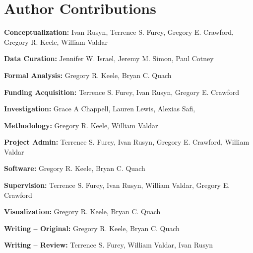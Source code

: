 \documentclass[10pt,letterpaper]{article}
\begin{document}
\section*{Author Contributions}

\noindent \textbf{Conceptualization:} Ivan Rusyn, Terrence S. Furey, Gregory E. Crawford, Gregory R. Keele, William Valdar

\noindent \textbf{Data Curation:} Jennifer W. Israel, Jeremy M. Simon, Paul Cotney

\noindent \textbf{Formal Analysis:} Gregory R. Keele, Bryan C. Quach

\noindent \textbf{Funding Acquisition:} Terrence S. Furey, Ivan Rusyn, Gregory E. Crawford

\noindent \textbf{Investigation:} Grace A Chappell, Lauren Lewis, Alexias Safi,

\noindent \textbf{Methodology:} Gregory R. Keele, William Valdar

\noindent \textbf{Project Admin:} Terrence S. Furey, Ivan Rusyn, Gregory E. Crawford, William Valdar

\noindent \textbf{Software:} Gregory R. Keele, Bryan C. Quach

\noindent \textbf{Supervision:} Terrence S. Furey, Ivan Rusyn, William Valdar, Gregory E. Crawford

\noindent \textbf{Visualization:} Gregory R. Keele, Bryan C. Quach

\noindent \textbf{Writing – Original:} Gregory R. Keele, Bryan C. Quach

\noindent \textbf{Writing – Review:} Terrence S. Furey, William Valdar, Ivan Rusyn
 
\nolinenumbers

%
%
% 
%
\end{document}
